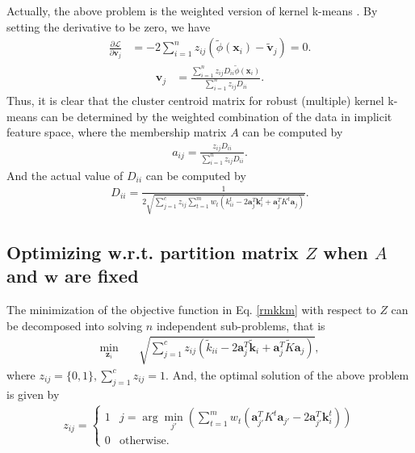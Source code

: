\documentclass{article}
\begin{document}
Actually, the above problem is the weighted version of kernel k-means \cite{dhillon2004kernel}. By setting the derivative to be zero, we have
\begin{align}
  \frac{\partial \mathcal{L} }{\partial \bm{v}_j} &= -2\sum_{i=1}^{n}z_{ij}(\tilde{\phi}(\bm{x}_i) - \tilde{\bm{v}}_j) = 0.
\end{align}
\begin{align}\label{v_update}
  \bm{v}_j &= \frac{\sum_{i=1}^{n}z_{ij} D_{ii} \tilde{\phi}(\bm{x}_i)}{\sum_{i=1}^{n}z_{ij} D_{ii}}.
\end{align}
Thus, it is clear that the cluster centroid matrix for robust (multiple) kernel k-means can be determined by the weighted combination of the data in implicit feature space, where the membership matrix $A$ can be computed by
\begin{align}\label{update_a}
  a_{ij} = \frac{z_{ij} D_{ii} }{\sum_{i=1}^{n}z_{ij} D_{ii}}.
\end{align}
And the actual value of $D_{ii}$ can be computed by
\begin{align}\label{update_d}
  D_{ii} = \frac{1}{2\sqrt{\sum_{j=1}^{c}z_{ij}\sum_{t=1}^{m}w_t( k_{ii}^{t} - 2 \bm{a}_j^T \bm{k}_i^t + \bm{a}_j^T K^t \bm{a}_j )}}.
\end{align}
\subsection{Optimizing w.r.t. partition matrix $Z$ when $A$ and $\bm{w}$ are fixed}
The minimization of the objective function in Eq. \eqref{rmkkm} with respect to $Z$ can be decomposed into solving $n$ independent sub-problems, that is
\begin{align}
\min_{\bm{z}_i} \quad& \sqrt{\sum_{j=1}^{c} z_{ij}(\tilde{k}_{ii} - 2 \bm{a}_j^T \tilde{\bm{k}}_i + \bm{a}_j^T \tilde{K} \bm{a}_j )},
\end{align}
where $z_{ij} = \{0, 1\}, \sum_{j=1}^{c} z_{ij} = 1$.
And, the optimal solution of the above problem is given by
\begin{align}\label{update_z}
  z_{ij} \!=\! \left\{ \begin{array}{ll}
                     1 & j=\arg\min_{j'}(\sum_{t=1}^{m}w_t( \bm{a}_{j'}^T K^t \bm{a}_{j'}  \!-\! 2 \bm{a}_{j'}^T \bm{k}_i^t )) \\
                     0 & \textrm{otherwise.}
                   \end{array}
  \right.
\end{align}
\end{document}
